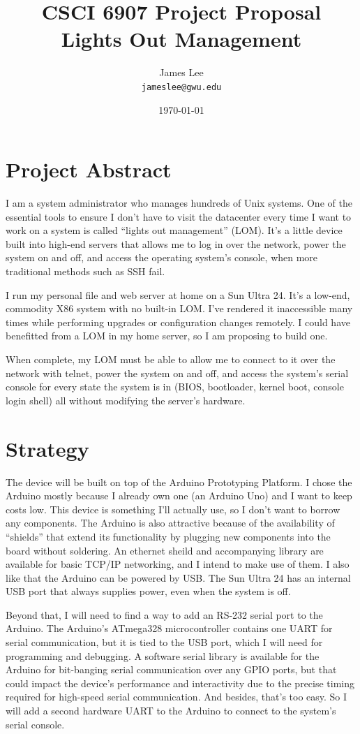 \documentclass{amsart}
\title{CSCI 6907 Project Proposal\\
Lights Out Management}
\author{James Lee\\
\texttt{jameslee@gwu.edu}}
\date{\today}
\begin{document}
\maketitle

\section{Project Abstract}
I am a system administrator who manages hundreds of Unix systems.  One of the essential tools to ensure I don't have to visit the datacenter every time I want to work on a system is called ``lights out management'' (LOM).  It's a little device built into high-end servers that allows me to log in over the network, power the system on and off, and access the operating system's console, when more traditional methods such as SSH fail.

I run my personal file and web server at home on a Sun Ultra 24.  It's a low-end, commodity X86 system with no built-in LOM.  I've rendered it inaccessible many times while performing upgrades or configuration changes remotely.  I could have benefitted from a LOM in my home server, so I am proposing to build one.

When complete, my LOM must be able to allow me to connect to it over the network with telnet, power the system on and off, and access the system's serial console for every state the system is in (BIOS, bootloader, kernel boot, console login shell) all without modifying the server's hardware.

\section{Strategy}
The device will be built on top of the Arduino Prototyping Platform.  I chose the Arduino mostly because I already own one (an Arduino Uno) and I want to keep costs low.  This device is something I'll actually use, so I don't want to borrow any components.  The Arduino is also attractive because of the availability of ``shields'' that extend its functionality by plugging new components into the board without soldering.  An ethernet sheild and accompanying library are available for basic TCP/IP networking, and I intend to make use of them.  I also like that the Arduino can be powered by USB.  The Sun Ultra 24 has an internal USB port that always supplies power, even when the system is off.

Beyond that, I will need to find a way to add an RS-232 serial port to the Arduino.  The Arduino's ATmega328 microcontroller contains one UART for serial communication, but it is tied to the USB port, which I will need for programming and debugging.  A software serial library is available for the Arduino for bit-banging serial communication over any GPIO ports, but that could impact the device's performance and interactivity due to the precise timing required for high-speed serial communication.  And besides, that's too easy.  So I will add a second hardware UART to the Arduino to connect to the system's serial console.
\end{document}
